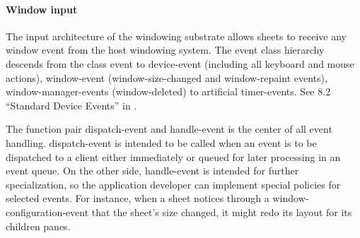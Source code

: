 \documentclass[twocolumn,a4paper]{article}
\newcommand {\concept} [1] {{\sl #1}\index{#1}}
\newcommand {\code}[1]{{\sffamily #1}}
\newcommand {\CLIM}{{\small CLIM}}
\begin{document}
\paragraph*{Window input}
The input architecture of the windowing substrate allows sheets to receive any window event from the host windowing system. The event class hierarchy descends from the class \code{event} to \code{device-event} (including all keyboard and mouse actions), \code{window-event} (window-size-changed and window-repaint events), \code{window-manager-events} (window-deleted) to artificial \code{timer-events}. See 8.2 ``Standard Device Events'' in \cite{clim-spec}.

The function pair \code{dispatch-event} and \code{handle-event} is the center of all event handling. \code{dispatch-event} is intended to be called when an event is to be dispatched to a client either immediately or queued for later processing in an event queue. On the other side, \code{handle-event} is intended for further specialization, so the application developer can implement special policies for selected events. For instance, when a sheet notices through a \code{window-configuration-event} that the sheet's size changed, it might redo its layout for its children panes.


\end{document}
